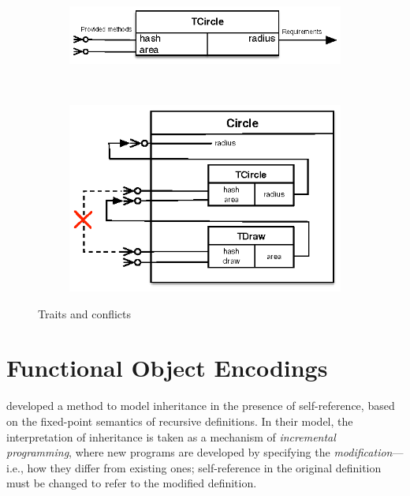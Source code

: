 \begin{figure}
  \centering
  \begin{subfigure}[b]{0.45\textwidth}
    \includegraphics[scale=0.85]{figures/trait1.eps}
     \label{fig:trait}
  \end{subfigure} ~
  \begin{subfigure}[b]{0.45\textwidth}
    \includegraphics{figures/trait3.eps}
     \label{fig:trait:conflict}
  \end{subfigure}
  \caption{Traits and conflicts}
\end{figure}



\section{Functional Object Encodings}

\label{sec:bg:object}

\citet{cook1989denotational} developed a method to model inheritance in the
presence of self-reference, based on the fixed-point semantics of recursive
definitions. In their model, the interpretation of inheritance is taken as a
mechanism of \textit{incremental programming}, where new programs are developed
by specifying the \textit{modification}---i.e., how they differ from existing
ones; self-reference in the original definition must be changed to refer to the
modified definition.

